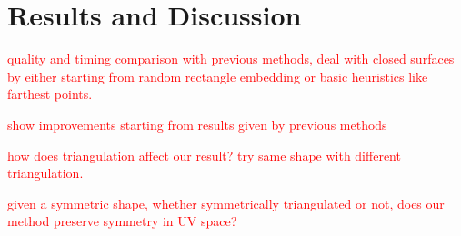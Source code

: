 \section{Results and Discussion}

\textcolor{red}{quality and timing comparison with previous methods, deal with closed surfaces by either starting from random rectangle embedding or basic heuristics like farthest points.}

\textcolor{red}{show improvements starting from results given by previous methods}

\textcolor{red}{how does triangulation affect our result? try same shape with different triangulation.}

\textcolor{red}{given a symmetric shape, whether symmetrically triangulated or not, does our method preserve symmetry in UV space?}